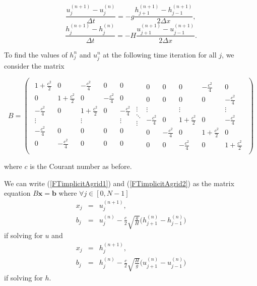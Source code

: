 \documentclass[a4paper, 10pt, notitlepage]{article}
\begin{document}
\begin{equation} \label{FTimplicitAgrid1}
\frac{u_{j}^{(n+1)} - u_{j}^{(n)}}{\Delta t} = -g \frac{h_{j+1}^{(n+1)} - h_{j-1}^{(n+1)}}{2\Delta x},
\end{equation}
\begin{equation}\label{FTimplicitAgrid2}
\frac{h_{j}^{(n+1)} - h_{j}^{(n)}}{\Delta t} = -H \frac{u_{j+1}^{(n+1)} - u_{j-1}^{(n+1)}}{2\Delta x}.
\end{equation}

To find the values of $h_{j}^{n}$ and $u_{j}^{n}$ at the following time iteration for all $j$, we consider the matrix

\[
B = \left (
\begin{array}{ccc}
\begin{array}{ccccc}
1 + \frac{c^{2}}{2} & 0 & -\frac{c^{2}}{4} & 0 & 0\\
0& 1 + \frac{c^{2}}{2} & 0 & -\frac{c^{2}}{4} & 0\\
-\frac{c^{2}}{4} & 0& 1 + \frac{c^{2}}{2} & 0 & -\frac{c^{2}}{4}\\
\vdots & & \vdots & & \vdots\\
- \frac{c^{2}}{4} & 0 & 0 & 0 & 0\\
0 & - \frac{c^{2}}{4} & 0 & 0 & 0\\
\end{array}
\begin{array}{c}
\vdots\\ 
\ddots\\
\vdots
\end{array}
\begin{array}{ccccc}
0 & 0 & 0 & - \frac{c^{2}}{4} & 0\\
0 & 0 & 0 & 0 & - \frac{c^{2}}{4}\\
\vdots & & \vdots & & \vdots\\
-\frac{c^{2}}{4}& 0 & 1 + \frac{c^{2}}{2} & 0 & -\frac{c^{2}}{4} \\
0 & -\frac{c^{2}}{4} & 0 & 1 + \frac{c^{2}}{2} & 0\\
0 & 0 & -\frac{c^{2}}{4}& 0 & 1 + \frac{c^{2}}{2}
\end{array}
\end{array}
\right )
\]

where $c$ is the Courant number as before.

We can write (\ref{FTimplicitAgrid1}) and (\ref{FTimplicitAgrid2}) as the matrix equation $B \mathbf{x} = \mathbf{b}$ where $\forall j \in [0, N-1]$
\begin{eqnarray}
x_{j} & = & u_{j}^{(n+1)},\\
b_{j} & = & u_{j}^{(n)} - \frac{c}{2}\sqrt{\frac{g}{H}}\bigg(h_{j+1}^{(n)} - h_{j-1}^{(n)}\bigg) 
\end{eqnarray}
if solving for $u$ and 
\begin{eqnarray}
x_{j} & = & h_{j}^{(n+1)},\\
b_{j} & = & h_{j}^{(n)} - \frac{c}{2}\sqrt{\frac{H}{g}}\bigg(u_{j+1}^{(n)} - u_{j-1}^{(n)}\bigg)
\end{eqnarray}
if solving for $h$.
\end{document}
